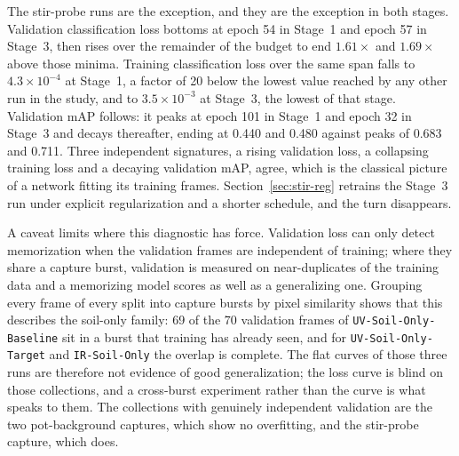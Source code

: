 ﻿\documentclass[journal]{IEEEtran}
\begin{document}
The stir-probe runs are the exception, and they are the exception in both stages. Validation classification loss bottoms at epoch 54 in Stage~1 and epoch 57 in Stage~3, then rises over the remainder of the budget to end $1.61\times$ and $1.69\times$ above those minima. Training classification loss over the same span falls to $4.3 \times 10^{-4}$ at Stage~1, a factor of 20 below the lowest value reached by any other run in the study, and to $3.5 \times 10^{-3}$ at Stage~3, the lowest of that stage. Validation mAP follows: it peaks at epoch 101 in Stage~1 and epoch 32 in Stage~3 and decays thereafter, ending at 0.440 and 0.480 against peaks of 0.683 and 0.711. Three independent signatures, a rising validation loss, a collapsing training loss and a decaying validation mAP, agree, which is the classical picture of a network fitting its training frames. Section~\ref{sec:stir-reg} retrains the Stage~3 run under explicit regularization and a shorter schedule, and the turn disappears.

A caveat limits where this diagnostic has force. Validation loss can only detect memorization when the validation frames are independent of training; where they share a capture burst, validation is measured on near-duplicates of the training data and a memorizing model scores as well as a generalizing one. Grouping every frame of every split into capture bursts by pixel similarity shows that this describes the soil-only family: 69 of the 70 validation frames of \texttt{UV-Soil-Only-Baseline} sit in a burst that training has already seen, and for \texttt{UV-Soil-Only-Target} and \texttt{IR-Soil-Only} the overlap is complete. The flat curves of those three runs are therefore not evidence of good generalization; the loss curve is blind on those collections, and a cross-burst experiment rather than the curve is what speaks to them. The collections with genuinely independent validation are the two pot-background captures, which show no overfitting, and the stir-probe capture, which does.
\end{document}
